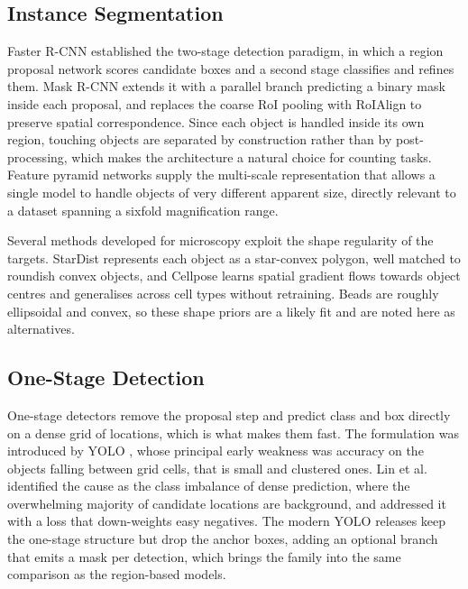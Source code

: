 \subsection{Instance Segmentation}

Faster R-CNN \cite{ren2015faster} established the two-stage detection paradigm, in
which a region proposal network scores candidate boxes and a second stage
classifies and refines them. Mask R-CNN \cite{he2017mask} extends it with a
parallel branch predicting a binary mask inside each proposal, and replaces the
coarse RoI pooling with RoIAlign to preserve spatial correspondence. Since each
object is handled inside its own region, touching objects are separated by
construction rather than by post-processing, which makes the architecture a
natural choice for counting tasks. Feature pyramid networks \cite{lin2017feature}
supply the multi-scale representation that allows a single model to handle objects
of very different apparent size, directly relevant to a dataset spanning a sixfold
magnification range.

Several methods developed for microscopy exploit the shape regularity of the
targets. StarDist \cite{schmidt2018stardist} represents each object as a
star-convex polygon, well matched to roundish convex objects, and Cellpose
\cite{stringer2021cellpose} learns spatial gradient flows towards object centres
and generalises across cell types without retraining. Beads are
roughly ellipsoidal and convex, so these shape priors are a likely fit
and are noted here as alternatives.

\subsection{One-Stage Detection}
\label{sec:onestage}

One-stage detectors remove the proposal step and predict class and box directly on
a dense grid of locations, which is what makes them fast. The formulation was
introduced by YOLO \cite{redmon2016yolo}, whose principal early weakness was
accuracy on the objects falling between grid cells, that is small and clustered
ones. Lin et al.\ \cite{lin2020focal} identified the cause as the class imbalance
of dense prediction, where the overwhelming majority of candidate locations are
background, and addressed it with a loss that down-weights easy negatives. The
modern YOLO releases \cite{jocher2023ultralytics} keep the one-stage structure but
drop the anchor boxes, adding an optional branch that emits a mask per detection,
which brings the family into the same comparison as the region-based models.

